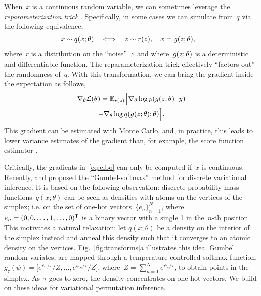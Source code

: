 \documentclass[twoside]{article}
\begin{document}
When~$x$ is a continuous random variable, we can sometimes leverage the \emph{reparameterization trick}
\citep{Salimans2013, Kingma2014}.  Specifically, in some cases we can
simulate from~$q$ via the following equivalence,
\begin{align*}
  x &\sim q(x; \theta)
      & \iff & &  
  z &\sim r(z), \quad x = g(z;\theta),
\end{align*}
where~$r$ is a distribution on the ``noise''~$z$ and
where~$g(z; \theta)$ is a deterministic and differentiable
function.
The reparameterization trick effectively ``factors out'' the randomness
of~$q$. With this transformation, we can bring the gradient inside the
expectation as follows,
\begin{multline}
  \label{eq:elbo}
  \nabla_\theta \mathcal{L}(\theta) 
  = \mathbb{E}_{r(z)} \Big[ \nabla_\theta \log p(g(z; \theta) \, | \, y) \\
    - \nabla_\theta  \log q(g(z; \theta); \theta) \Big].
\end{multline}
This gradient can be estimated with Monte Carlo, and, in practice,
this leads to lower variance estimates of the gradient than, for
example, the score function estimator \citep{Williams1992, Glynn1990}.

Critically, the gradients in~\eqref{eq:elbo} can only be computed
if~$x$ is continuous. Recently, \citet{maddison2016concrete} and
\citet{jang2016categorical} proposed the ``Gumbel-softmax'' method for
discrete variational inference. It is based on the following
observation: discrete probability mass functions~$q(x; \theta)$ can be
seen as densities with atoms on the vertices of the simplex; i.e. on
the set of one-hot vectors~${\{e_n\}_{n=1}^N}$,
where~${e_n = (0, 0, \ldots, 1, \ldots, 0)^{\mathsf{T}}}$ is a binary vector
with a single 1 in the~$n$-th position. This motivates a natural
relaxation: let $q(x; \theta)$ be a density on the interior of the
simplex instead and anneal this density such that it converges to an
atomic density on the vertices. Fig.~\ref{fig:transforms}a illustrates
this idea. Gumbel random variates, are mapped through a
temperature-controlled softmax function,
${g_\tau(\psi) = \big[e^{\psi_1 / \tau}/Z, \ldots, e^{\psi_N / \tau}/Z
  \big]}$, where~${Z=\sum_{n=1}^N e^{\psi_n / \tau}}$, to obtain
points in the simplex. As~$\tau$ goes to zero, the density
concentrates on one-hot vectors.  We build on these ideas for
variational permutation inference.
\end{document}
